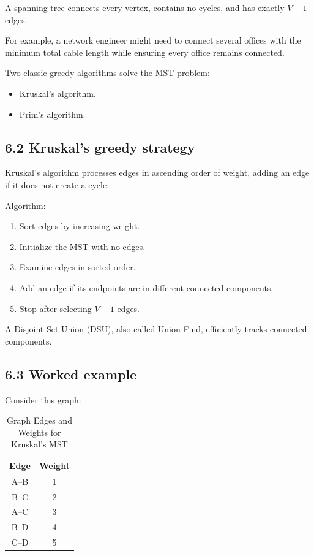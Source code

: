 A spanning tree connects every vertex, contains no cycles, and has exactly $V-1$ edges.

For example, a network engineer might need to connect several offices with the minimum total cable length while ensuring every office remains connected.

Two classic greedy algorithms solve the MST problem:

\begin{itemize}
    \item Kruskal's algorithm.
    \item Prim's algorithm.
\end{itemize}

\subsection{6.2 Kruskal's greedy strategy}

Kruskal's algorithm processes edges in ascending order of weight, adding an edge if it does not create a cycle.

Algorithm:

\begin{enumerate}
    \item Sort edges by increasing weight.
    \item Initialize the MST with no edges.
    \item Examine edges in sorted order.
    \item Add an edge if its endpoints are in different connected components.
    \item Stop after selecting $V-1$ edges.
\end{enumerate}

A Disjoint Set Union (DSU), also called Union-Find, efficiently tracks connected components.

\subsection{6.3 Worked example}

Consider this graph:

\begin{table}[htbp]
\centering
\caption{Graph Edges and Weights for Kruskal's MST}
\label{tab:kruskal_edges}
\begin{tabular}{cc}
\toprule
\textbf{Edge} & \textbf{Weight} \\
\midrule
A--B & 1 \\
B--C & 2 \\
A--C & 3 \\
B--D & 4 \\
C--D & 5 \\
\bottomrule
\end{tabular}
\end{table}

